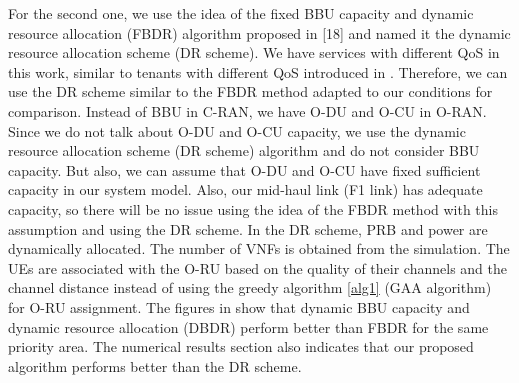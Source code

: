 \documentclass[lettersize,journal]{IEEEtran}
\begin{document}
For the second one, we use the idea of the fixed BBU capacity and dynamic resource allocation (FBDR) algorithm proposed in [18] and named it the dynamic resource allocation scheme (DR scheme). 
 We have services with different QoS in this work, similar to tenants with different QoS introduced in \cite{lee2018dynamic}. Therefore, we can use the DR scheme similar to the FBDR method adapted to our conditions for comparison. Instead of BBU in C-RAN, we have O-DU and O-CU in O-RAN.
 Since we do not talk about O-DU and O-CU capacity, we use the dynamic resource allocation scheme (DR scheme) algorithm and do not consider BBU capacity.
But also, we can assume that O-DU and O-CU have fixed sufficient capacity in our system model. Also, our mid-haul link (F1 link) has adequate capacity, so there will be no issue using the idea of the FBDR method with this assumption and using the DR scheme. In the DR scheme, PRB and power are dynamically allocated. The number of VNFs is obtained from the simulation. The UEs are associated with the O-RU based on the quality of their channels and the channel distance instead of using the greedy algorithm \ref{alg1} (GAA algorithm) for O-RU assignment. The figures in \cite{lee2018dynamic} show that dynamic BBU capacity and dynamic resource allocation (DBDR) perform better than FBDR for the same priority area. The numerical results section also indicates that our proposed algorithm performs better than the DR scheme.

\vspace*{-1em}
\end{document}
